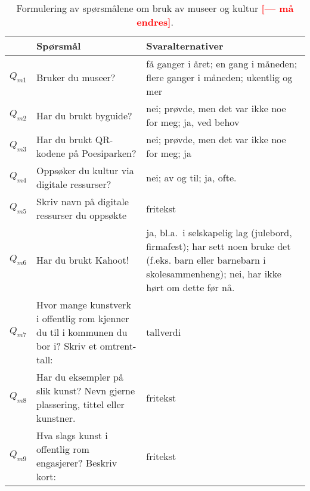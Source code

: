 \documentclass[11pt,english]{nik}
\newcommand{\WVL}[1]{\textbf{\textcolor{red}{#1}}}
\begin{document}

\begin{sidewaystable}
    \caption{Formulering av spørsmålene om bruk av museer og kultur \WVL{[--- må endres]}.} \label{tab:questions:m}
\centering\small
\begin{tabular}{lp{.43\hsize}p{.43\hsize}}
 & Spørsmål & Svaralternativer \\
\hline
\(Q_{m1}\) & Bruker du museer?  & få ganger i året; en gang i måneden; flere ganger i måneden; ukentlig og mer\\
\(Q_{m2}\) & Har du brukt byguide?  & nei; prøvde, men det var ikke noe for meg; ja, ved behov\\
\(Q_{m3}\) & Har du brukt QR-kodene på Poesiparken? & nei; prøvde, men det var ikke noe for meg; ja\\
\(Q_{m4}\) & Oppsøker du kultur via digitale ressurser?  &nei; av og til; ja, ofte.\\
\(Q_{m5}\) & Skriv navn på digitale ressurser du oppsøkte  & fritekst\\
\(Q_{m6}\) & Har du brukt Kahoot!  & ja, bl.a.\ i selskapelig lag (julebord, firmafest); har sett noen bruke det (f.eks. barn eller barnebarn i skolesammenheng); nei, har ikke hørt om dette før nå.\\
\(Q_{m7}\) & Hvor mange kunstverk i offentlig rom kjenner du til i kommunen du bor i? Skriv et omtrent-tall:  & tallverdi \\
\(Q_{m8}\) & Har du eksempler på slik kunst? Nevn gjerne plassering, tittel eller kunstner.  & fritekst\\
\(Q_{m9}\) & Hva slags kunst i offentlig rom engasjerer? Beskriv kort:  & fritekst
\end{tabular}
\end{sidewaystable}


\end{document}

